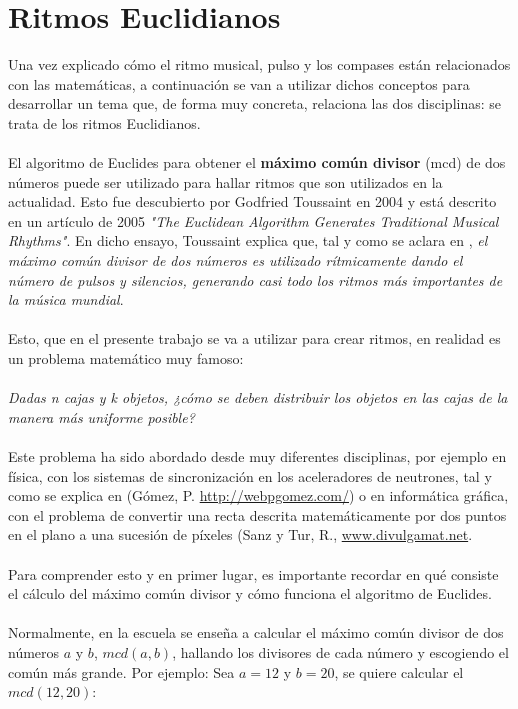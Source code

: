 \documentclass[a4paper, openright, 11pt, titlepage]{report}
\theoremstyle{definition}\newtheorem{defin}[propo]{Definition}
\theoremstyle{definition}\newtheorem{obser}[propo]{Remark}
\theoremstyle{definition}\newtheorem{ejem}[propo]{Ejemplo}
\theoremstyle{definition}\newtheorem{algoritmo}[propo]{Algoritmo}
\begin{document}
\section{Ritmos Euclidianos}
Una vez explicado cómo el ritmo musical, pulso y los compases están relacionados con las matemáticas, a continuación se van a utilizar dichos conceptos para desarrollar un tema que, de forma muy concreta, relaciona las dos disciplinas: se trata de los ritmos Euclidianos.\\\\
El algoritmo de Euclides para obtener el \textbf{máximo común divisor} (mcd) de dos números puede ser utilizado para hallar ritmos que son utilizados en la actualidad. Esto fue descubierto por Godfried Toussaint en 2004 y está descrito en un artículo de 2005 \textit{"The Euclidean Algorithm Generates Traditional Musical Rhythms"}. En dicho ensayo, Toussaint explica que, tal y como se aclara en \cite{wikieuclides}, \textit{el máximo común divisor de dos números es utilizado rítmicamente dando el número de pulsos y silencios, generando casi todo los ritmos más importantes de la música mundial}. \\\\
Esto, que en el presente trabajo se va a utilizar para crear ritmos, en realidad es un problema matemático muy famoso: \\\\
\textit{Dadas n cajas y k objetos, ¿cómo se deben distribuir los objetos en las cajas de la manera más uniforme posible?}\\\\
Este problema ha sido abordado desde muy diferentes disciplinas, por ejemplo en física, con los sistemas de sincronización en los aceleradores de neutrones, tal y como se explica en \cite{ritmos} (Gómez, P. \url{http://webpgomez.com/}) o en informática gráfica, con el problema de convertir una recta descrita matemáticamente por dos puntos en el plano a una sucesión de píxeles \cite{ritmos2} (Sanz y Tur, R., \url{www.divulgamat.net}.\\\\
Para comprender esto y en primer lugar, es importante recordar en qué consiste el cálculo del máximo común divisor y cómo funciona el algoritmo de Euclides.\\\\
Normalmente, en la escuela se enseña a calcular el máximo común divisor de dos números $a$ y $b$, $mcd(a, b)$, hallando los divisores de cada número y escogiendo el común más grande. Por ejemplo: Sea $a = 12$ y $b = 20$, se quiere calcular el $mcd(12,20)$: 
\end{document}
